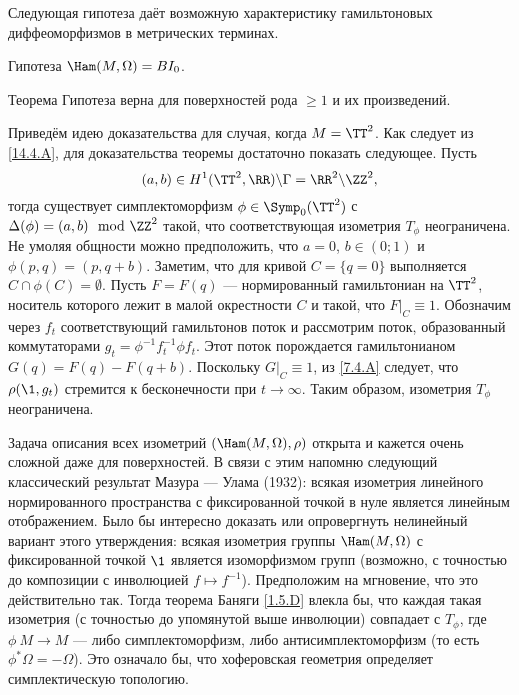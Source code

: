 Следующая гипотеза даёт возможную характеристику гамильтоновых диффеоморфизмов в метрических терминах.

\begin{ex*}{Гипотеза}
 $\Ham(M,\Omega) = BI_0$.
\end{ex*}


\begin{thm}[(\cite{LP})]{Теорема}\label{14.4.B}
Гипотеза верна для поверхностей рода $\ge1$ и их произведений.
\end{thm}

 
Приведём идею доказательства для случая, когда $M=\TT^2$.
Как следует из \ref{14.4.A}, для доказательства теоремы достаточно показать следующее.
Пусть
\[(a,b)\in H^1(\TT^2,\RR)\backslash\Gamma=\RR^2\backslash\ZZ^2,\]
тогда существует симплектоморфизм $\phi\in\Symp_0(\TT^2)$ с $\Delta (\phi) = (a, b) \mod \ZZ^2$ такой, что соответствующая изометрия $T_\phi$ неограничена.
Не умоляя общности можно предположить, что $a= 0$, $b \in (0; 1)$ и $\phi(p, q) = (p, q + b)$.
Заметим, что для кривой $C = \{q = 0\}$ выполняется $C \cap \phi(C) = \emptyset$.
Пусть $F = F(q)$ --- нормированный гамильтониан на $\TT^2$, носитель которого лежит в малой окрестности $C$ и такой, что $F|_C \equiv 1$.
Обозначим через $f_t$ соответствующий гамильтонов поток и рассмотрим поток, образованный коммутаторами $g_t = \phi^{-1}f_t^{-1}\phi f_t$.
Этот поток порождается гамильтонианом $G(q) = F(q) - F(q + b)$.
Поскольку $G|_C \equiv 1$, из \ref{7.4.A} следует, что $\rho(\1, g_t)$ стремится к бесконечности при $t \to \infty$.
Таким образом, изометрия $T_\phi$ неограничена.

Задача описания всех изометрий $(\Ham(M,\Omega), \rho)$ открыта и кажется очень сложной даже для поверхностей.
В связи с этим напомню следующий классический результат Мазура --- Улама \cite{MU} (1932): всякая изометрия линейного нормированного пространства с фиксированной точкой в нуле является линейным отображением.
Было бы интересно доказать или опровергнуть нелинейный вариант этого утверждения: всякая изометрия группы $\Ham(M,\Omega)$ с фиксированной точкой $\1$ является изоморфизмом групп (возможно, с точностью до композиции с инволюцией $f\mapsto f^{-1}$).
Предположим на мгновение, что это действительно так.
Тогда теорема Баняги \ref{1.5.D} влекла бы, что каждая такая изометрия (с точностью до упомянутой выше инволюции) совпадает с $T_\phi$, где $\phi\: M \to M$ --- либо симплектоморфизм, либо антисимплектоморфизм (то есть $\phi^\ast\Omega = -\Omega$).
Это означало бы, что хоферовская геометрия определяет симплектическую топологию.
